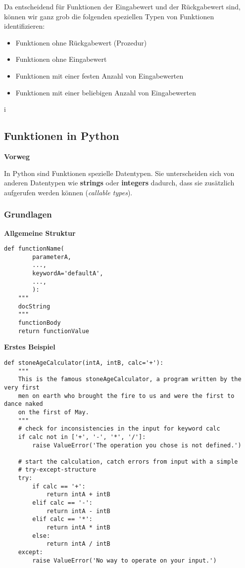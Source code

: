 Da entscheidend für Funktionen der Eingabewert und der Rückgabewert
sind, können wir ganz grob die folgenden speziellen Typen von Funktionen
identifizieren:

\begin{itemize}
\itemsep1pt\parskip0pt
\item
  {Funktionen ohne Rückgabewert (Prozedur)}
\item
  {Funktionen ohne Eingabewert}
\item
  {Funktionen mit einer festen Anzahl von Eingabewerten}
\item
  {Funktionen mit einer beliebigen Anzahl von Eingabewerten}
\end{itemize}
i
\subsection{Funktionen in Python}


\par\noindent\textbf{Vorweg}

In Python sind Funktionen spezielle Datentypen. Sie unterscheiden sich
von anderen Datentypen wie \textbf{strings} oder \textbf{integers}
dadurch, dass sie zusätzlich aufgerufen werden können (\emph{callable
types}).



\subsubsection{Grundlagen}

\par\noindent\textbf{Allgemeine Struktur}

\begin{verbatim}
def functionName(
        parameterA,
        ...,
        keywordA='defaultA',
        ...,
        ):
    """
    docString
    """
    functionBody
    return functionValue
\end{verbatim}




\par\noindent\textbf{Erstes Beispiel}

\begin{verbatim}
def stoneAgeCalculator(intA, intB, calc='+'):
    """
    This is the famous stoneAgeCalculator, a program written by the very first
    men on earth who brought the fire to us and were the first to dance naked
    on the first of May.
    """
    # check for inconsistencies in the input for keyword calc
    if calc not in ['+', '-', '*', '/']:
        raise ValueError('The operation you chose is not defined.')

    # start the calculation, catch errors from input with a simple
    # try-except-structure
    try:
        if calc == '+':
            return intA + intB
        elif calc == '-':
            return intA - intB
        elif calc == '*':
            return intA * intB
        else:
            return intA / intB
    except:
        raise ValueError('No way to operate on your input.')
\end{verbatim}




